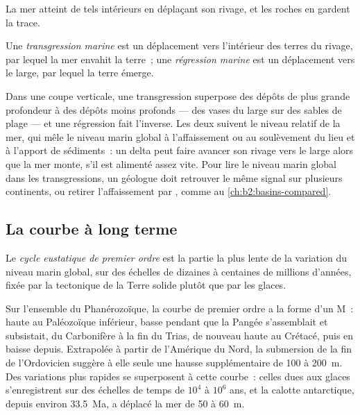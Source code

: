 La mer atteint de tels intérieurs en déplaçant son rivage, et les roches en gardent la trace.

\begin{definition}\label{def:b2:phanerozoic-earth:transgression}
Une \emph{transgression marine} est un déplacement vers l'intérieur
des terres du rivage, par lequel la mer envahit la terre~; une
\emph{régression marine} est un déplacement vers le large, par lequel la terre émerge.
\end{definition}

Dans une coupe verticale, une transgression superpose des dépôts de plus grande profondeur à des
dépôts moins profonds --- des vases du large sur des sables de plage --- et une régression fait
l'inverse. Les deux suivent le niveau relatif de la mer, qui mêle le niveau marin global à
l'affaissement ou au soulèvement du lieu et à l'apport de sédiments~: un delta peut faire avancer
son rivage vers le large alors que la mer monte, s'il est alimenté assez vite. Pour lire le niveau
marin global dans les transgressions, un géologue doit retrouver le même signal sur plusieurs
continents, ou retirer l'affaissement par , comme au \cref{ch:b2:basins-compared}.

\subsection*{La courbe à long terme}

\begin{definition}\label{def:b2:phanerozoic-earth:first-order}
Le \emph{cycle eustatique de premier ordre} est la partie
la plus lente de la variation du niveau marin global, sur des échelles de dizaines à centaines
de millions d'années, fixée par la tectonique de la Terre solide plutôt que par les glaces.
\end{definition}

Sur l'ensemble du Phanérozoïque, la courbe de premier ordre a la forme d'un M~: haute au Paléozoïque
inférieur, basse pendant que la Pangée s'assemblait et subsistait, du Carbonifère à la fin du Trias, de
nouveau haute au Crétacé, puis en baisse depuis. Extrapolée à partir de l'Amérique du Nord, la
submersion de la fin de l'Ordovicien suggère à elle seule une hausse supplémentaire de 100 à \qty{200}{m}.
Des variations plus rapides se superposent à cette courbe~: celles dues aux glaces
s'enregistrent sur des échelles de temps de $10^4$ à $10^6$ ans, et la calotte
antarctique, depuis environ \qty{33.5}{Ma}, a déplacé la mer de 50 à \qty{60}{m}.

